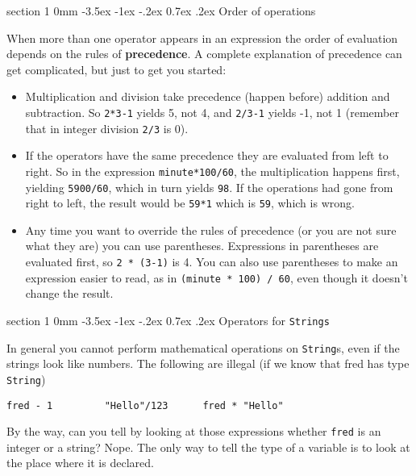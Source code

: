 \documentclass{book}
\makeatletter
\renewcommand{\section}{\@startsection 
    {section} {1} {0mm}%
    {-3.5ex \@plus -1ex \@minus -.2ex}%
    {0.7ex \@plus.2ex}%
    {\normalfont\Large\bfseries}}
\makeatother
\begin{document}
\section{Order of operations}

When more than one operator appears in an expression the order
of evaluation depends on the rules of {\bf precedence}.  A
complete explanation of precedence can get complicated, but
just to get you started:

\begin{itemize}

\item Multiplication and division take precedence (happen before)
addition and subtraction.  So {\tt 2*3-1} yields 5, not 4, and
{\tt 2/3-1} yields -1, not 1 (remember that in integer division
{\tt 2/3} is 0).

\item If the operators have the same precedence they are evaluated
from left to right.  So in the expression {\tt minute*100/60},
the multiplication happens first, yielding {\tt 5900/60}, which
in turn yields {\tt 98}.  If the operations had gone from right
to left, the result would be {\tt 59*1} which is {\tt 59}, which
is wrong.

\item Any time you want to override the rules of precedence (or
you are not sure what they are) you can use parentheses.  Expressions
in parentheses are evaluated first, so {\tt 2 * (3-1)} is 4.
You can also use parentheses to make an expression easier to
read, as in {\tt (minute * 100) / 60}, even though it doesn't
change the result.

\end{itemize}

\section{Operators for {\tt Strings}}

In general you cannot perform mathematical operations on {\tt String}s,
even if the strings look like numbers.  The following are
illegal (if we know that fred has type {\tt String})

\begin{verbatim}
fred - 1         "Hello"/123      fred * "Hello"
\end{verbatim}
%
By the way, can you tell by looking at those expressions
whether {\tt fred} is an integer or a string?  Nope.
The only way to tell the type of a variable is to look at
the place where it is declared.
\end{document}
